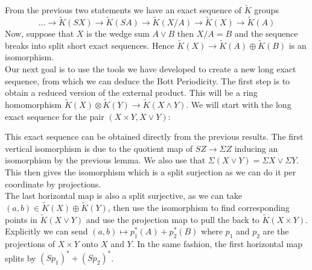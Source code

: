 \documentclass[../Thesis.tex]{subfiles}
\begin{document}
From the previous two statements we have an exact sequence of $\tilde{K}$ groups
\begin{equation}
 ...\rightarrow \tilde{K}(SX) \rightarrow \tilde{K}(SA) \rightarrow \tilde{K}(X/A) \rightarrow \tilde{K}(X) \rightarrow \tilde{K}(A)
 \end{equation}
Now, suppose that $X$ is the wedge sum $A \vee B$ then $X/A = B $ and the sequence breaks into split short exact sequences. Hence $\tilde{K}(X) \rightarrow \tilde{K}(A)\oplus \tilde{K}(B)$ is an isomorphism.
\\Our next goal is to use the tools we have developed to create a new long exact sequence, from which we can deduce the Bott Periodicity. The first step is to obtain a reduced version of the external product. This will be a ring homomorphism $\tilde{K}(X) \otimes \tilde{K}(Y) \rightarrow \tilde{K}(X \wedge Y)$. We will start with the long exact sequence for the pair $(X \times Y, X \vee Y)$:
\\\begin{center}

\end{center}
This exact sequence can be obtained directly from the previous results. The first vertical isomorphism is due to the quotient map of $SZ \rightarrow \Sigma Z$ inducing an isomorphism by the previous lemma. We also use that $\Sigma(X \vee Y) = \Sigma X \vee \Sigma Y$. This then gives the isomorphism which is a split surjection as we can do it per coordinate by projections.
\\The last horizontal map is also a split surjective, as we can take $(a,b) \in \tilde{K}(X) \oplus \tilde{K}(Y)$, then use the isomorphism to find corresponding points in $\tilde{K}(X \vee Y)$ and use the projection map to pull the back to $\tilde{K}(X \times Y)$. Explicitly we can send $(a,b) \mapsto p_1^*(A) + p_2^*(B)$ where $p_1$ and $p_2$ are the projections of $X \times Y$ onto $X$ and $Y$. In the same fashion, the first horizontal map splits by $(Sp_1)^* + (Sp_2)^*$.
\end{document}
